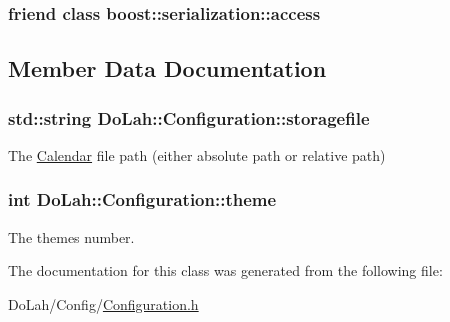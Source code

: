 \subsubsection[{boost\+::serialization\+::access}]{\setlength{\rightskip}{0pt plus 5cm}friend class boost\+::serialization\+::access\hspace{0.3cm}{\ttfamily [friend]}}\label{class_do_lah_1_1_configuration_ac98d07dd8f7b70e16ccb9a01abf56b9c}


\subsection{Member Data Documentation}
\hypertarget{class_do_lah_1_1_configuration_a18677d9cc2cdecba1b4d2d69320135b4}{}
\subsubsection[{storagefile}]{\setlength{\rightskip}{0pt plus 5cm}std\+::string Do\+Lah\+::\+Configuration\+::storagefile}\label{class_do_lah_1_1_configuration_a18677d9cc2cdecba1b4d2d69320135b4}


The \hyperlink{class_do_lah_1_1_calendar}{Calendar} file path (either absolute path or relative path) 

\hypertarget{class_do_lah_1_1_configuration_ae53919c98ff4c97b8ec92cfd056c793c}{}
\subsubsection[{theme}]{\setlength{\rightskip}{0pt plus 5cm}int Do\+Lah\+::\+Configuration\+::theme}\label{class_do_lah_1_1_configuration_ae53919c98ff4c97b8ec92cfd056c793c}


The themes number. 



The documentation for this class was generated from the following file\+:\begin{DoxyCompactItemize}
\item 
Do\+Lah/\+Config/\hyperlink{_configuration_8h}{Configuration.\+h}\end{DoxyCompactItemize}
